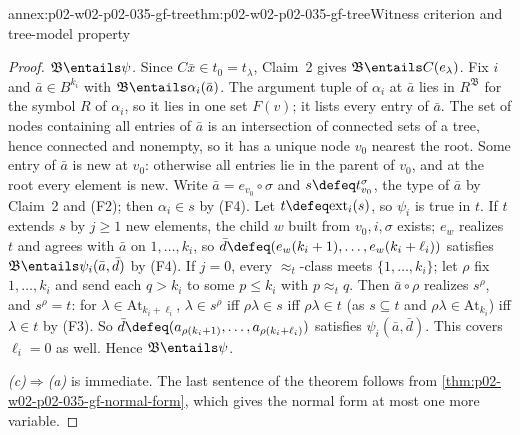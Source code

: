 \begin{annexitem}{annex:p02-w02-p02-035-gf-tree}{thm:p02-w02-p02-035-gf-tree}{Witness criterion and tree-model property}
\begin{proof}
\emph{\(\mathfrak B\entails\psi\).}  Since \(C\bar x\in t_0=t_\lambda\),
Claim~2 gives \(\mathfrak B\entails C(e_\lambda)\).  Fix \(i\) and
\(\bar a\in B^{k_i}\) with \(\mathfrak B\entails\alpha_i(\bar a)\).  The
argument tuple of \(\alpha_i\) at \(\bar a\) lies in \(R^{\mathfrak B}\) for
the symbol \(R\) of \(\alpha_i\), so it lies in one set \(F(v)\); it lists
every entry of \(\bar a\).  The set of nodes containing all entries of
\(\bar a\) is an intersection of connected sets of a tree, hence connected
and nonempty, so it has a unique node \(v_0\) nearest the root.  Some entry
of \(\bar a\) is new at \(v_0\): otherwise all entries lie in the parent of
\(v_0\), and at the root every element is new.  Write
\(\bar a=e_{v_0}\circ\sigma\) and \(s\defeq t_{v_0}^\sigma\), the type of
\(\bar a\) by Claim~2 and (F2); then \(\alpha_i\in s\) by (F4).  Let
\(t\defeq\mathrm{ext}_i(s)\), so \(\psi_i\) is true in \(t\).  If \(t\)
extends \(s\) by \(j\geq1\) new elements, the child \(w\) built from
\(v_0,i,\sigma\) exists; \(e_w\) realizes \(t\) and agrees with \(\bar a\) on
\(1,\ldots,k_i\), so \(\bar d\defeq(e_w(k_i+1),\ldots,e_w(k_i+\ell_i))\)
satisfies \(\mathfrak B\entails\psi_i(\bar a,\bar d)\) by (F4).  If \(j=0\),
every \(\approx_t\)-class meets \(\{1,\ldots,k_i\}\); let \(\rho\) fix
\(1,\ldots,k_i\) and send each \(q>k_i\) to some \(p\leq k_i\) with
\(p\approx_tq\).  Then \(\bar a\circ\rho\) realizes \(s^\rho\), and
\(s^\rho=t\): for \(\lambda\in\mathrm{At}_{k_i+\ell_i}\), \(\lambda\in s^\rho\)
iff \(\rho\lambda\in s\) iff \(\rho\lambda\in t\) (as \(s\subseteq t\) and
\(\rho\lambda\in\mathrm{At}_{k_i}\)) iff \(\lambda\in t\) by (F3).  So
\(\bar d\defeq(a_{\rho(k_i+1)},\ldots,a_{\rho(k_i+\ell_i)})\) satisfies
\(\psi_i(\bar a,\bar d)\).  This covers \(\ell_i=0\) as well.  Hence
\(\mathfrak B\entails\psi\).

\emph{(c)\(\Rightarrow\)(a)} is immediate.  The last sentence of the theorem
follows from \cref{thm:p02-w02-p02-035-gf-normal-form}, which gives the
normal form at most one more variable.
\end{proof}
\end{annexitem}

